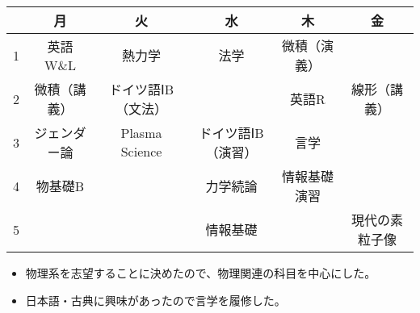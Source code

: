 \documentclass[dvipdfmx]{jsarticle}
\begin{document}
\begin{tabular}{|c||c|c|c|c|c|}
    \hline
    & 月 & 火 & 水 & 木 & 金 \\
    \hline\hline
    1 & 英語W\&L & 熱力学 & 法学 & 微積（演義） & \\
    \hline
    2 & 微積（講義） & ドイツ語ⅠB（文法） &  & 英語R & 線形（講義）\\
    \hline
    3 & ジェンダー論 & Plasma Science & ドイツ語ⅠB（演習） & 言学 & \\
    \hline
    4 & 物基礎B &  & 力学続論 & 情報基礎演習 & \\
    \hline
    5 &  &  & 情報基礎 &  & 現代の素粒子像\\
    \hline

\end{tabular}


\begin{itemize}
    \item 物理系を志望することに決めたので、物理関連の科目を中心にした。
    \item 日本語・古典に興味があったので言学を履修した。
\end{itemize}
    
\end{document}
